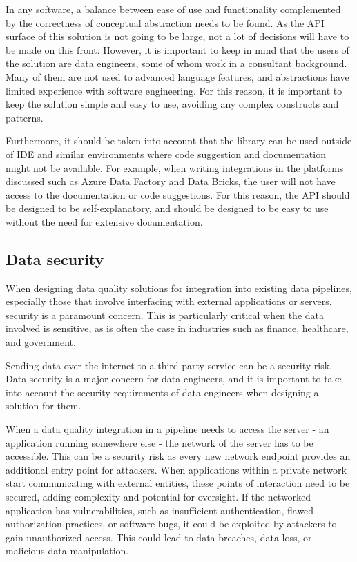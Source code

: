 In any software, a balance between ease of use and functionality complemented by the correctness of conceptual abstraction needs to be found. As the API surface of this solution is not going to be large, not a lot of decisions will have to be made on this front. However, it is important to keep in mind that the users of the solution are data engineers, some of whom work in a consultant background. Many of them are not used to advanced language features, and abstractions have limited experience with software engineering. For this reason, it is important to keep the solution simple and easy to use, avoiding any complex constructs and patterns.

Furthermore, it should be taken into account that the library can be used outside of IDE and similar environments where code suggestion and documentation might not be available. For example, when writing integrations in the platforms discussed such as Azure Data Factory and Data Bricks, the user will not have access to the documentation or code suggestions. For this reason, the API should be designed to be self-explanatory, and should be designed to be easy to use without the need for extensive documentation.

\subsection{Data security}

When designing data quality solutions for integration into existing data pipelines, especially those that involve interfacing with external applications or servers, security is a paramount concern. This is particularly critical when the data involved is sensitive, as is often the case in industries such as finance, healthcare, and government.

Sending data over the internet to a third-party service can be a security risk. Data security is a major concern for data engineers, and it is important to take into account the security requirements of data engineers when designing a solution for them.

When a data quality integration in a pipeline needs to access the server - an application running somewhere else - the network of the server has to be accessible. This can be a security risk as every new network endpoint provides an additional entry point for attackers. When applications within a private network start communicating with external entities, these points of interaction need to be secured, adding complexity and potential for oversight.  If the networked application has vulnerabilities, such as insufficient authentication, flawed authorization practices, or software bugs, it could be exploited by attackers to gain unauthorized access. This could lead to data breaches, data loss, or malicious data manipulation. 

